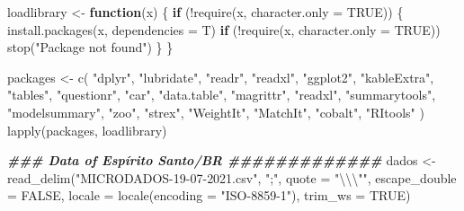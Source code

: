 \documentclass[
]{article}
\newenvironment{Shaded}{\begin{snugshade}}{\end{snugshade}}
\newcommand{\AttributeTok}[1]{\textcolor[rgb]{0.77,0.63,0.00}{#1}}
\newcommand{\ConstantTok}[1]{\textcolor[rgb]{0.00,0.00,0.00}{#1}}
\newcommand{\ControlFlowTok}[1]{\textcolor[rgb]{0.13,0.29,0.53}{\textbf{#1}}}
\newcommand{\DocumentationTok}[1]{\textcolor[rgb]{0.56,0.35,0.01}{\textbf{\textit{#1}}}}
\newcommand{\FunctionTok}[1]{\textcolor[rgb]{0.00,0.00,0.00}{#1}}
\newcommand{\NormalTok}[1]{#1}
\newcommand{\OtherTok}[1]{\textcolor[rgb]{0.56,0.35,0.01}{#1}}
\newcommand{\SpecialCharTok}[1]{\textcolor[rgb]{0.00,0.00,0.00}{#1}}
\newcommand{\StringTok}[1]{\textcolor[rgb]{0.31,0.60,0.02}{#1}}
\begin{document}
\begin{Shaded}
\begin{Highlighting}[]
\NormalTok{loadlibrary }\OtherTok{\textless{}{-}} \ControlFlowTok{function}\NormalTok{(x) \{}
  \ControlFlowTok{if}\NormalTok{ (}\SpecialCharTok{!}\FunctionTok{require}\NormalTok{(x, }\AttributeTok{character.only =} \ConstantTok{TRUE}\NormalTok{)) \{}
    \FunctionTok{install.packages}\NormalTok{(x, }\AttributeTok{dependencies =}\NormalTok{ T)}
    \ControlFlowTok{if}\NormalTok{ (}\SpecialCharTok{!}\FunctionTok{require}\NormalTok{(x, }\AttributeTok{character.only =} \ConstantTok{TRUE}\NormalTok{))}
      \FunctionTok{stop}\NormalTok{(}\StringTok{"Package not found"}\NormalTok{)}
\NormalTok{  \}}
\NormalTok{\}}

\NormalTok{packages }\OtherTok{\textless{}{-}}
  \FunctionTok{c}\NormalTok{(}
    \StringTok{"dplyr"}\NormalTok{,}
    \StringTok{"lubridate"}\NormalTok{,}
    \StringTok{"readr"}\NormalTok{,}
    \StringTok{"readxl"}\NormalTok{,}
    \StringTok{"ggplot2"}\NormalTok{,}
    \StringTok{"kableExtra"}\NormalTok{,}
    \StringTok{"tables"}\NormalTok{,}
    \StringTok{"questionr"}\NormalTok{,}
    \StringTok{"car"}\NormalTok{,}
    \StringTok{"data.table"}\NormalTok{,}
    \StringTok{"magrittr"}\NormalTok{,}
    \StringTok{"readxl"}\NormalTok{,}
    \StringTok{"summarytools"}\NormalTok{,}
    \StringTok{"modelsummary"}\NormalTok{,}
    \StringTok{"zoo"}\NormalTok{, }
    \StringTok{"strex"}\NormalTok{,}
    \StringTok{"WeightIt"}\NormalTok{, }
    \StringTok{"MatchIt"}\NormalTok{,}
    \StringTok{"cobalt"}\NormalTok{,}
    \StringTok{"RItools"}
\NormalTok{  )}
\FunctionTok{lapply}\NormalTok{(packages, loadlibrary)}

\DocumentationTok{\#\#\# Data of Espírito Santo/BR \#\#\#\#\#\#\#\#\#\#\#\#\#}
\NormalTok{dados }\OtherTok{\textless{}{-}} \FunctionTok{read\_delim}\NormalTok{(}\StringTok{"MICRODADOS{-}19{-}07{-}2021.csv"}\NormalTok{, }
                         \StringTok{";"}\NormalTok{, }\AttributeTok{quote =} \StringTok{"}\SpecialCharTok{\textbackslash{}\textbackslash{}\textbackslash{}"}\StringTok{"}\NormalTok{, }\AttributeTok{escape\_double =} \ConstantTok{FALSE}\NormalTok{, }
                         \AttributeTok{locale =} \FunctionTok{locale}\NormalTok{(}\AttributeTok{encoding =} \StringTok{"ISO{-}8859{-}1"}\NormalTok{), }
                         \AttributeTok{trim\_ws =} \ConstantTok{TRUE}\NormalTok{)}
\end{Highlighting}
\end{Shaded}
\end{document}
